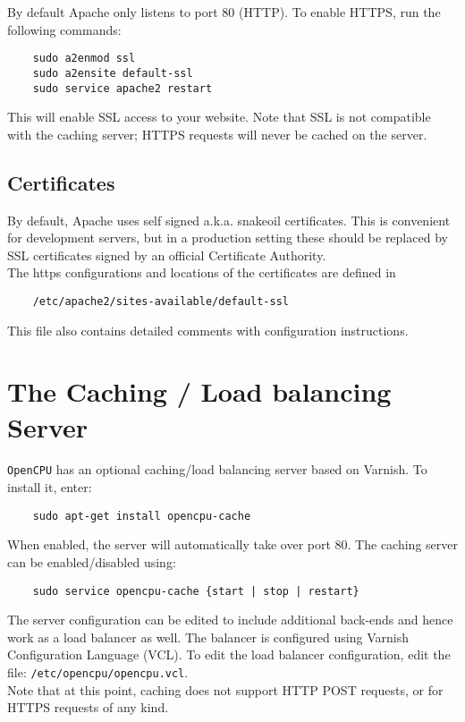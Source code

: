 \documentclass{scrartcl}
\begin{document}
By default Apache only listens to port 80 (HTTP). To enable HTTPS, run the
following commands:

\begin{verbatim}
    sudo a2enmod ssl
    sudo a2ensite default-ssl
    sudo service apache2 restart
\end{verbatim}
This will enable SSL access to your website. Note that SSL is not compatible
with the caching server; HTTPS requests will never be cached on the server.

\subsection{Certificates}
By default, Apache uses self signed a.k.a. snakeoil certificates. This is
convenient for development servers, but in a production setting these should be
replaced by SSL certificates signed by an official Certificate Authority. \\

\noindent The https configurations and locations of the certificates are defined
in

\begin{verbatim}
    /etc/apache2/sites-available/default-ssl
\end{verbatim}
This file also contains detailed comments with configuration instructions.

\section{The Caching / Load balancing Server}

\texttt{OpenCPU} has an optional caching/load balancing server based on Varnish.
To install it, enter:

\begin{verbatim}
    sudo apt-get install opencpu-cache
\end{verbatim}
When enabled, the server will automatically take over port 80. The caching
server can be enabled/disabled using:

\begin{verbatim}
    sudo service opencpu-cache {start | stop | restart}
\end{verbatim}
The server configuration can be edited to include additional back-ends and hence
work as a load balancer as well. The balancer is configured using Varnish
Configuration Language (VCL). To edit the load balancer configuration, edit the
file: \texttt{/etc/opencpu/opencpu.vcl}. \\

\noindent Note that at this point, caching does not support HTTP POST requests,
or for HTTPS requests of any kind.
\end{document}
